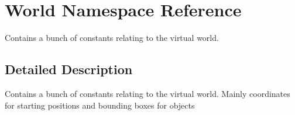 \hypertarget{namespaceWorld}{
\section{World Namespace Reference}
\label{namespaceWorld}
}


Contains a bunch of constants relating to the virtual world.  




\subsection{Detailed Description}
Contains a bunch of constants relating to the virtual world. Mainly coordinates for starting positions and bounding boxes for objects 